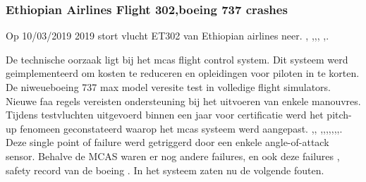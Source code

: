 \documentclass{article}
\begin{document}
	\subsubsection{Ethiopian Airlines Flight 302,boeing 737 crashes}
	\newline \indent  Op  10/03/2019 2019 stort vlucht ET302 van Ethiopian airlines neer.  \cite{gates18112020boeingcrisis},
	\cite{boeing737maxsoftwareprobles},\cite{avetisov19032019boeingmalwarestate},\cite{thompson23112020nationalsecurityboeing},
	\cite{wiki737maxgroundings},\cite{campbell02052019boengcrashhumanerrors}.
	
	
	De technische oorzaak ligt bij het mcas flight control system. Dit systeem werd geimplementeerd om kosten te reduceren en opleidingen voor piloten  in te korten. De niweueboeing 737 max model veresite test in volledige flight simulators. Nieuwe faa regels vereisten ondersteuning bij het uitvoeren van enkele manouvres. Tijdens testvluchten uitgevoerd binnen een jaar voor certificatie werd het pitch-up fenomeen geconstateerd waarop het mcas systeem werd aangepast. 
	\cite{hawkins22032019737maxairplanes},\cite{barnett05052019737maxcrisis}, \cite{thomas30082020737safest},\cite{boyle18112020737maxupgrade},\cite{bergstraburgess122019737maxMcasAlgorithm},\cite{737mcas},\cite{german190620217372yaftergrounded},\cite{beningo02052019boeinglessons},\cite{bloomberg26092019failedpred},\cite{afacwaLostSafeguards}. Deze single point of failure \cite{uran05042019SPOF}
	werd getriggerd door een enkele angle-of-attack sensor\cite{boeing737maxdisplay}.
	Behalve de MCAS waren er nog andere failures\cite{fehrm24112020737changes}, en ook deze failures \cite{dohertylindeman15032019737problems}
	\cite{travis18042019737maxsoftwaredevop},
	safety record van de boeing
	\cite{touitou11032019737tragedies}.
	In het  systeem zaten nu de volgende fouten.
	
\end{document}
